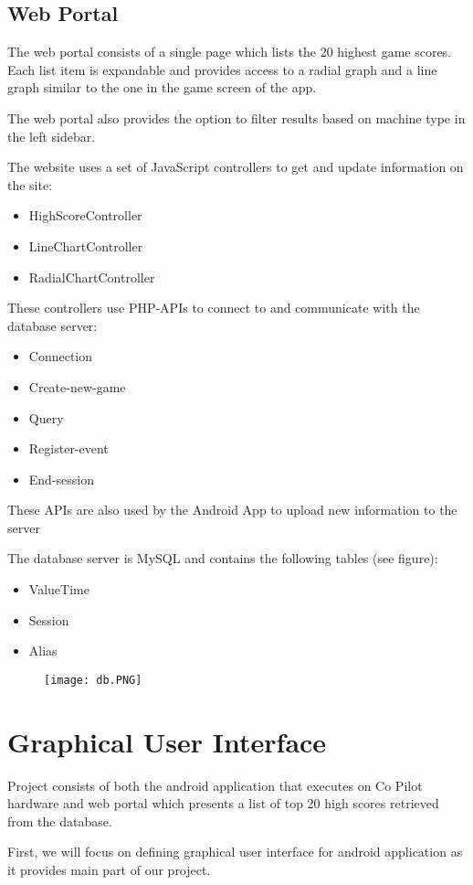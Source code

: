 \documentclass{article}
\begin{document}
\subsection{Web Portal}
The web portal consists of a single page which lists the 20 highest game scores. Each list item is expandable and provides access to a radial graph and a line graph similar to the one in the game screen of the app.

The web portal also provides the option to filter results based on machine type in the left sidebar.

The website uses a set of JavaScript controllers to get and update information on the site:
\begin{itemize}
\item HighScoreController
\item LineChartController
\item RadialChartController
\end{itemize}
These controllers use PHP-APIs to connect to and communicate with the database server:
\begin{itemize}
\item Connection
\item Create-new-game
\item Query
\item Register-event
\item End-session
\end{itemize}
These APIs are also used by the Android App to upload new information to the server

The database server is MySQL and contains the following tables (see figure):
\begin{itemize}
\item ValueTime
\item Session
\item Alias
\end{itemize}
\begin{figure}[h!]
\centering
\texttt{[image: db.PNG]}
\end{figure}
\section{Graphical User Interface}
Project consists of both the android application that executes on Co Pilot hardware and web portal which presents a list of top 20 high scores retrieved from the database.

First, we will focus on defining graphical user interface for android application as it provides main part of our project.
\end{document}
